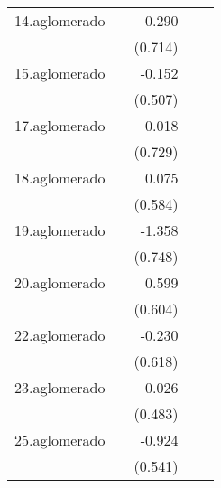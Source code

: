 {\begin{longtable}{l*{4}{D{.}{.}{-1}}}
\addlinespace
14.aglomerado&                     &      -0.290         &                     &                     \\
            &                     &     (0.714)         &                     &                     \\
\addlinespace
15.aglomerado&                     &      -0.152         &                     &                     \\
            &                     &     (0.507)         &                     &                     \\
\addlinespace
17.aglomerado&                     &       0.018         &                     &                     \\
            &                     &     (0.729)         &                     &                     \\
\addlinespace
18.aglomerado&                     &       0.075         &                     &                     \\
            &                     &     (0.584)         &                     &                     \\
\addlinespace
19.aglomerado&                     &      -1.358         &                     &                     \\
            &                     &     (0.748)         &                     &                     \\
\addlinespace
20.aglomerado&                     &       0.599         &                     &                     \\
            &                     &     (0.604)         &                     &                     \\
\addlinespace
22.aglomerado&                     &      -0.230         &                     &                     \\
            &                     &     (0.618)         &                     &                     \\
\addlinespace
23.aglomerado&                     &       0.026         &                     &                     \\
            &                     &     (0.483)         &                     &                     \\
\addlinespace
25.aglomerado&                     &      -0.924         &                     &                     \\
            &                     &     (0.541)         &                     &                     \\

\end{longtable}}
